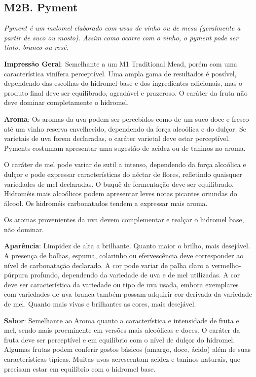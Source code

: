 \subsection*{M2B. Pyment}

\textit{Pyment é um melomel elaborado com uvas de vinho ou de mesa (geralmente a partir de suco ou mosto). Assim como ocorre com o vinho, o pyment pode ser tinto, branco ou rosé.}

\textbf{Impressão Geral}: Semelhante a um M1 Traditional Mead, porém com uma característica vinífera perceptível. Uma ampla gama de resultados é possível, dependendo das escolhas do hidromel base e dos ingredientes adicionais, mas o produto final deve ser equilibrado, agradável e prazeroso. O caráter da fruta não deve dominar completamente o hidromel.

\textbf{Aroma}: Os aromas da uva podem ser percebidos como de um suco doce e fresco até um vinho reserva envelhecido, dependendo da força alcoólica e do dulçor. Se varietais de uva forem declaradas, o caráter varietal deve estar perceptível. Pyments costumam apresentar uma sugestão de acidez ou de taninos no aroma.

O caráter de mel pode variar de sutil a intenso, dependendo da força alcoólica e dulçor e pode expressar características do néctar de flores, refletindo quaisquer variedades de mel declaradas. O buquê de fermentação deve ser equilibrado. Hidroméis mais alcoólicos podem apresentar leves notas picantes oriundas do álcool. Os hidroméis carbonatados tendem a expressar mais aroma.

Os aromas provenientes da uva devem complementar e realçar o hidromel base, não dominar.

\textbf{Aparência}: Limpidez de alta a brilhante. Quanto maior o brilho, mais desejável. A presença de bolhas, espuma, colarinho ou efervescência deve corresponder ao nível de carbonatação declarado. A cor pode variar de palha claro a vermelho-púrpura profundo, dependendo da variedade de uva e de mel utilizadas. A cor deve ser característica da variedade ou tipo de uva usada, embora exemplares com variedades de uva branca também possam adquirir cor derivada da variedade de mel. Quanto mais vivas e brilhantes as cores, mais desejável.

\textbf{Sabor}: Semelhante ao Aroma quanto a característica e intensidade de fruta e mel, sendo mais proeminente em versões mais alcoólicas e doces. O caráter da fruta deve ser perceptível e em equilíbrio com o nível de dulçor do hidromel. Algumas frutas podem conferir gostos básicos (amargo, doce, ácido) além de suas características típicas. Muitas uvas acrescentam acidez e taninos naturais, que precisam estar em equilíbrio com o hidromel base.


